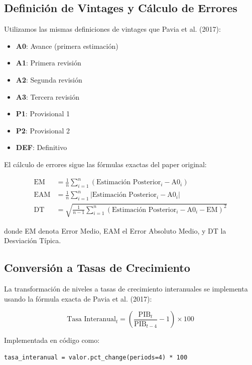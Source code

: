 \documentclass[12pt,a4paper]{article}
\begin{document}
\subsection{Definición de Vintages y Cálculo de Errores}

Utilizamos las mismas definiciones de vintages que Pavia et al. (2017):

\begin{itemize}
\item \textbf{A0}: Avance (primera estimación)
\item \textbf{A1}: Primera revisión
\item \textbf{A2}: Segunda revisión  
\item \textbf{A3}: Tercera revisión
\item \textbf{P1}: Provisional 1
\item \textbf{P2}: Provisional 2
\item \textbf{DEF}: Definitivo
\end{itemize}

El cálculo de errores sigue las fórmulas exactas del paper original:

\begin{align}
\text{EM} &= \frac{1}{n}\sum_{i=1}^{n}(\text{Estimación Posterior}_i - \text{A0}_i) \label{eq:em}\\
\text{EAM} &= \frac{1}{n}\sum_{i=1}^{n}|\text{Estimación Posterior}_i - \text{A0}_i| \label{eq:eam}\\
\text{DT} &= \sqrt{\frac{1}{n-1}\sum_{i=1}^{n}(\text{Estimación Posterior}_i - \text{A0}_i - \text{EM})^2} \label{eq:dt}
\end{align}

donde EM denota Error Medio, EAM el Error Absoluto Medio, y DT la Desviación Típica.

\subsection{Conversión a Tasas de Crecimiento}

La transformación de niveles a tasas de crecimiento interanuales se implementa usando la fórmula exacta de Pavia et al. (2017):

\begin{equation}
\text{Tasa Interanual}_t = \left(\frac{\text{PIB}_t}{\text{PIB}_{t-4}} - 1\right) \times 100
\end{equation}

Implementada en código como:
\begin{verbatim}
tasa_interanual = valor.pct_change(periods=4) * 100
\end{verbatim}
\end{document}
